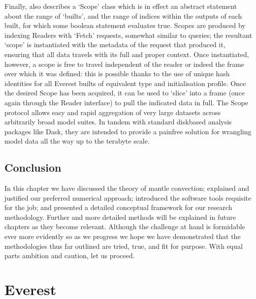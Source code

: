 \documentclass[letterpaper,10pt,english]{jupyterBook}
\begin{document}
\sphinxAtStartPar
Finally,  also describes a ‘Scope’ class which is in effect an abstract statement about the range of ‘builts’, and the range of indices within the outputs of each built, for which some boolean statement evaluates true. Scopes are produced by indexing Readers with ‘Fetch’ requests, somewhat similar to  queries; the resultant ‘scope’ is instantiated with the metadata of the request that produced it, ensuring that all data travels with its full and proper context. Once instantiated, however, a scope is free to travel independent of the reader or indeed the frame over which it was defined: this is possible thanks to the use of unique hash identities for all Everest builts of equivalent type and initialisation profile. Once the desired Scope has been acquired, it can be used to ‘slice’ into a frame (once again through the Reader interface) to pull the indicated data in full. The Scope protocol allows easy and rapid aggregation of very large datasets across arbitrarily broad model suites. In tandem with standard disk\sphinxhyphen{}based analysis packages like Dask, they are intended to provide a pain\sphinxhyphen{}free solution for wrangling model data all the way up to the terabyte scale.


\section{Conclusion}
\label{\detokenize{content/chapter_02_methods/conclusion:conclusion}}\label{\detokenize{content/chapter_02_methods/conclusion::doc}}
\sphinxAtStartPar
In this chapter we have discussed the theory of mantle convection; explained and justified our preferred numerical approach; introduced the software tools requisite for the job; and presented a detailed conceptual framework for our research methodology. Further and more detailed methods will be explained in future chapters as they become relevant. Although the challenge at hand is formidable \sphinxhyphen{} ever more evidently so as we progress \sphinxhyphen{} we hope we have demonstrated that the methodologies thus far outlined are tried, true, and fit for purpose. With equal parts ambition and caution, let us proceed.


\chapter{Everest}
\label{\detokenize{content/chapter_03_everest/main:everest}}\label{\detokenize{content/chapter_03_everest/main::doc}}
\end{document}
